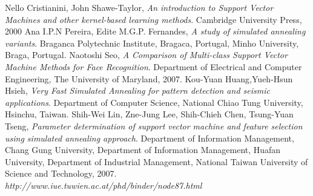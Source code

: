 \documentclass{article}
\begin{document}
\begin{thebibliography}{9}
Nello Cristianini, John Shawe-Taylor, \emph{An introduction to Support Vector Machines and other kernel-based learning methods}.
Cambridge University Press,
2000
Ana I.P.N Pereira, Edite M.G.P. Fernandes, \emph{A study of simulated annealing variants}.
Braganca Polytechnic Institute, Bragaca, Portugal,
Minho University, Braga, Portugal.
Naotoshi Seo, \emph{A Comparison of Multi-class Support Vector Machine Methods for Face Recognition}. 
Department of Electrical and Computer Engineering, The University of Maryland, 
2007.
Kou-Yuan Huang,Yueh-Hsun Hsieh, \emph{Very Fast Simulated Annealing for pattern detection and seismic applications}. Department of Computer Science, National Chiao Tung University, Hsinchu, Taiwan.
Shih-Wei Lin, Zne-Jung Lee, Shih-Chieh Chen, Tsung-Yuan Tseng, \emph{Parameter determination of support vector machine and feature selection using simulated annealing approach}. Department of Information Management, Chang Gung University, Department of Information Management, Huafan University, Department of Industrial Management, National Taiwan University of Science and Technology, 2007.
\emph{http://www.iue.tuwien.ac.at/phd/binder/node87.html}
\end{thebibliography}
\end{document}
